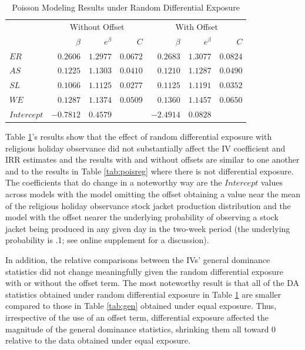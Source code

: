 \documentclass[ShortAfour,times,sageapa]{sagej}
\begin{document}
	\begin{table}[h!]
		\centering
		\caption{\centering Poisson Modeling Results under Random Differential Exposure}
		\begin{tabular}{l|rrrrrr}
			\toprule
			\multicolumn{1}{l}{} & \multicolumn{3}{c}{Without Offset} & \multicolumn{3}{c}{With Offset} \\ 
			\cmidrule(lr){2-4} \cmidrule(lr){5-7}
			\multicolumn{1}{l}{} & $\beta$ & $e^{\beta}$ & $C$ & $\beta$ & $e^{\beta}$ & $C$ \\ 
			\midrule
			$ER$ & $0.2606$ & $1.2977$ & $0.0672$ & $0.2683$ & $1.3077$ & $0.0824$ \\ 
			$AS$ & $0.1225$ & $1.1303$ & $0.0410$ & $0.1210$ & $1.1287$ & $0.0490$ \\ 
			$SL$ & $0.1066$ & $1.1125$ & $0.0277$ & $0.1125$ & $1.1191$ & $0.0352$ \\  
			$WE$ & $0.1287$ & $1.1374$ & $0.0509$ & $0.1360$ & $1.1457$ & $0.0650$ \\ 
			$Intercept$ & $-0.7812$ & $0.4579$ & & $-2.4914$ & $0.0828$ & \\ 
			\bottomrule
		\end{tabular}
	\label{tab:unexp}
	\end{table}
	
	Table \ref{tab:unexp}'s results show that the effect of random differential exposure with religious holiday observance did not substantially affect the IV coefficient and IRR estimates and the results with and without offsets are similar to one another and to the results in Table \ref{tab:poisreg} where there is not differential exposure.
	The coefficients that do change in a noteworthy way are the $Intercept$ values across models with the model omitting the offset obtaining a value near the mean of the religious holiday observance stock jacket production distribution and the model with the offset nearer the underlying probability of observing a stock jacket being produced in any given day in the two-week period (the underlying probability is .1; see online supplement for a discussion).
	
	In addition, the relative comparisons between the IVs' general dominance statistics did not change meaningfully given the random differential exposure with or without the offset term. 
	The most noteworthy result is that all of the DA statistics obtained under random differential exposure in Table \ref{tab:unexp} are smaller compared to those in Table \ref{tab:gen} obtained under equal exposure.
	Thus, irrespective of the use of an offset term, differential exposure affected the magnitude of the general dominance statistics, shrinking them all toward 0 relative to the data obtained under equal exposure.
	
\end{document}
